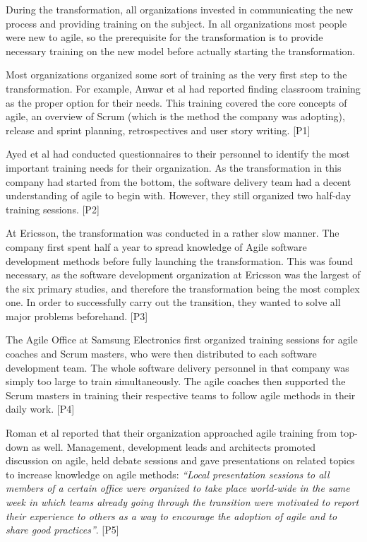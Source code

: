 During the transformation, all organizations invested in communicating
the new process and providing training on the subject. In all
organizations most people were new to agile, so the prerequisite for the
transformation is to provide necessary training on the new model before
actually starting the transformation.

Most organizations organized some sort of training as the very first
step to the transformation. For example, Anwar et al had reported
finding classroom training as the proper option for their needs. This
training covered the core concepts of agile, an overview of Scrum (which
is the method the company was adopting), release and sprint planning,
retrospectives and user story writing. [P1]

Ayed et al had conducted questionnaires to their personnel to identify
the most important training needs for their organization. As the
transformation in this company had started from the bottom, the software
delivery team had a decent understanding of agile to begin with.
However, they still organized two half-day training sessions. [P2]

At Ericsson, the transformation was conducted in a rather slow manner.
The company first spent half a year to spread knowledge of Agile
software development methods before fully launching the transformation.
This was found necessary, as the software development organization at
Ericsson was the largest of the six primary studies, and therefore the
transformation being the most complex one. In order to successfully
carry out the transition, they wanted to solve all major problems
beforehand. [P3]

The Agile Office at Samsung Electronics first organized training
sessions for agile coaches and Scrum masters, who were then distributed
to each software development team. The whole software delivery personnel
in that company was simply too large to train simultaneously. The agile
coaches then supported the Scrum masters in training their respective
teams to follow agile methods in their daily work. [P4]

Roman et al reported that their organization approached agile
training from top-down as well. Management, development leads and
architects promoted discussion on agile, held debate sessions and gave
presentations on related topics to increase knowledge on agile methods:
\textit{``Local presentation sessions to all members of a certain office
were organized to take place world-wide in the same week in which teams
already going through the transition were motivated to report their
experience to others as a way to encourage the adoption of agile and to
share good practices''}. [P5]
